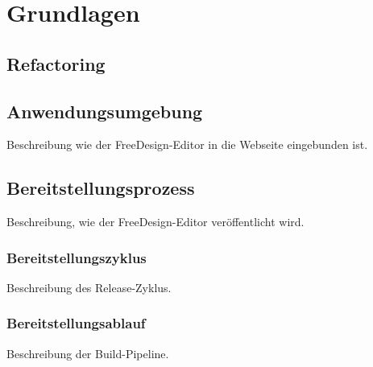 \chapter{Grundlagen}


\section{Refactoring}






\section{Anwendungsumgebung}
Beschreibung wie der FreeDesign-Editor in die Webseite eingebunden ist.

\section{Bereitstellungsprozess}
Beschreibung, wie der FreeDesign-Editor veröffentlicht wird.

\subsection{Bereitstellungszyklus}
Beschreibung des Release-Zyklus.

\subsection{Bereitstellungsablauf}
Beschreibung der Build-Pipeline.

